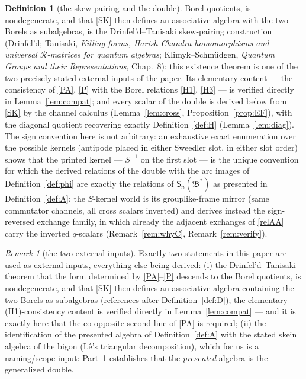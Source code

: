 \documentclass[11pt]{article}
\theoremstyle{definition}
\newtheorem{definition}[theorem]{Definition}
\theoremstyle{remark}
\newtheorem{remark}[theorem]{Remark}
\newcommand{\B}{\mathfrak{B}}
\newcommand{\Sn}{\mathsf{S}_n}
\begin{document}
\begin{definition}[the skew pairing and the double]
Borel quotients, is nondegenerate, and that \eqref{SK} then defines an
associative algebra with the two Borels as subalgebras, is the
Drinfel'd--Tanisaki skew-pairing construction (Drinfel'd; Tanisaki,
\emph{Killing forms, Harish-Chandra homomorphisms and universal
$\mathcal R$-matrices for quantum algebras}; Klimyk--Schm\"udgen,
\emph{Quantum Groups and their Representations}, Chap.~8): this
existence theorem is one of the two precisely stated external inputs
of the paper.  Its elementary content — the consistency of
\eqref{PA}, \eqref{P} with the Borel relations \eqref{H1}, \eqref{H3}
— is verified directly in Lemma~\ref{lem:compat}; and every scalar
of the double is derived below from \eqref{SK} by the channel calculus
(Lemma~\ref{lem:cross}, Proposition~\ref{prop:EF}), with the diagonal
quotient recovering exactly Definition~\ref{def:H}
(Lemma~\ref{lem:diag}).  The sign convention here is not arbitrary:
an exhaustive exact enumeration over the possible kernels
(antipode placed in either Sweedler slot, in either slot order) shows
that the printed kernel — $S^{-1}$ on the first slot — is the unique
convention for which the derived relations of the double with the
arc images of Definition~\ref{def:phi} are exactly the relations of
$\Sn(\B^*)$ as presented in Definition~\ref{def:A}: the $S$-kernel
world is its grouplike-frame mirror (same commutator channels, all
cross scalars inverted) and derives instead the sign-reversed
exchange family, in which already the adjacent exchanges of
\eqref{relAA} carry the inverted $q$-scalars
(Remark~\ref{rem:whyC}, Remark~\ref{rem:verify}).
\begin{remark}[the two external inputs]\label{rem:ext}
Exactly two statements in this paper are used as external inputs,
everything else being derived: (i) the Drinfel'd--Tanisaki theorem
that the form determined by \eqref{PA}--\eqref{P} descends to the
Borel quotients, is nondegenerate, and that \eqref{SK} then defines
an associative algebra containing the two Borels as subalgebras
(references after Definition~\ref{def:D}); the elementary
(H1)-consistency content is verified directly in
Lemma~\ref{lem:compat} — and it is exactly here that the co-opposite
second line of \eqref{PA} is required; (ii) the identification of
the presented algebra of Definition~\ref{def:A} with the stated
skein algebra of the bigon (L\^e's triangular decomposition), which
for us is a naming/scope input: Part~1 establishes that the
\emph{presented} algebra is the generalized double.
\end{remark}
\end{definition}
\end{document}
